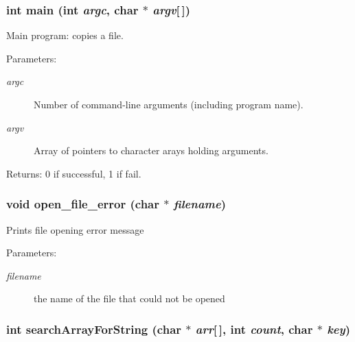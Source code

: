 \subsubsection{\setlength{\rightskip}{0pt plus 5cm}int main (int {\em argc}, char $\ast$ {\em argv}[$\,$])}\label{cptest2_8c_28052c36c3b61c6c0eaa18f5d226118f}


Main program: copies a file. \begin{Desc}
\item[Parameters:]
\begin{description}
\item[{\em argc}]Number of command-line arguments (including program name). \item[{\em argv}]Array of pointers to character arays holding arguments. \end{description}
\end{Desc}
\begin{Desc}
\item[Returns:]0 if successful, 1 if fail. \end{Desc}
\subsubsection{\setlength{\rightskip}{0pt plus 5cm}void open\_\-file\_\-error (char $\ast$ {\em filename})}\label{cptest2_8c_24e89f857b6c4f8cfadd8bf854978b28}


Prints file opening error message \begin{Desc}
\item[Parameters:]
\begin{description}
\item[{\em filename}]the name of the file that could not be opened \end{description}
\end{Desc}
\subsubsection{\setlength{\rightskip}{0pt plus 5cm}int search\-Array\-For\-String (char $\ast$ {\em arr}[$\,$], int {\em count}, char $\ast$ {\em key})}\label{cptest2_8c_5f698ce40c45c49d8bd086500a375741}


